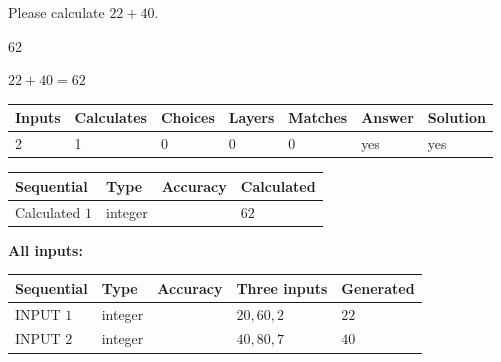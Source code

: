 \documentclass[12pt]{article}
\begin{document}
  
 
Please calculate $ %
22 +  %
40 $.
 
 
 
\noindent{}
 
 

62
 
 
\noindent{}
 
 

 
 
 
\noindent{}
 
 

$ %
22 +  %
40=   %
62$
 
 
\noindent{}
 
 

 
   
   
   
   
\noindent\begin{tabular}{|l|l|l|l|l|l|l|}
 \hline
Inputs & Calculates & Choices & Layers & Matches & Answer & Solution \\ \hline
 2  & 
 1  & 
 0
  & 
 0  & 
 0  & 
  yes & 
  yes 
  \\ \hline
 \end{tabular}
   
   
   
   
\noindent{}
   
   
  
  
\noindent\begin{tabular}{|l|l|l|l|}
\hline
 Sequential & Type & Accuracy & Calculated \\ 
\hline
 
 
  Calculated $  1 $ & integer &  & 
  $ 62 $ 
 \\  \hline  
 \end{tabular}
   
   
   
   
\noindent\vspace{0.1in}\hspace{-0.08in} {\textbf{\Large{All inputs: }}}
   
   
  
  
\noindent\begin{tabular}{|l|l|l|l|l|}
\hline
 Sequential & Type & Accuracy & Three inputs & Generated \\ 
\hline
 
 
  INPUT $  1 $ & integer &  & $
 20
 , 
 60
 , 
 2
 $ & $ 22 $ 
 \\  \hline  
 
 
  INPUT $  2 $ & integer &  & $
 40
 , 
 80
 , 
 7
 $ & $ 40 $ 
 \\  \hline  
 \end{tabular}
   
\end{document}
